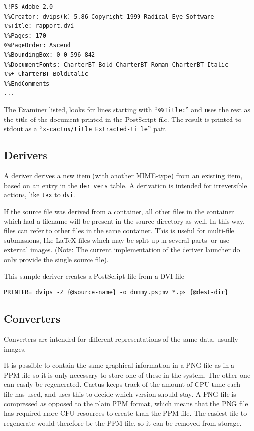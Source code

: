 \begin{verbatim}
%!PS-Adobe-2.0
%%Creator: dvips(k) 5.86 Copyright 1999 Radical Eye Software
%%Title: rapport.dvi
%%Pages: 170
%%PageOrder: Ascend
%%BoundingBox: 0 0 596 842
%%DocumentFonts: CharterBT-Bold CharterBT-Roman CharterBT-Italic
%%+ CharterBT-BoldItalic
%%EndComments
...
\end{verbatim}

The Examiner listed, looks for lines starting with
``\texttt{\%\%Title:}'' and uses the rest as the title of the document
printed in the PostScript file.  The result is printed to stdout as a
``\texttt{x-cactus/title Extracted-title}'' pair.  

\subsection{Derivers}

A deriver derives a new item (with another MIME-type) from
an existing item, based on an entry in the \texttt{derivers}
table.  A derivation is intended for irreversible actions, like
\texttt{tex} to \texttt{dvi}.

If the source file was derived from a container, all other files in
the container which had a filename will be present in the source
directory as well.  In this way, files can refer to other files in the
same container.  This is useful for multi-file submissions, like
{\LaTeX}-files which may be split up in several parts, or use external
images.  (Note:  The current implementation of the deriver launcher do
only provide the single source file).

This sample deriver creates a PostScript file from a DVI-file:

\begin{verbatim}
PRINTER= dvips -Z {@source-name} -o dummy.ps;mv *.ps {@dest-dir}
\end{verbatim}



\subsection{Converters}

Converters are intended for different representations of the same
data, usually images.

It is possible to contain the same graphical information in a PNG file
as in a PPM file so it is only necessary to store one of these in the
system.   The other one can easily be regenerated.  Cactus keeps track
of the amount of CPU time each file has used, and uses this to decide
which version should stay.   A PNG file is compressed as opposed to
the plain PPM format, which means that the PNG file has required more
CPU-resources to create than the PPM file.  The easiest file to
regenerate would therefore be the PPM file, so it can be removed from
storage.

